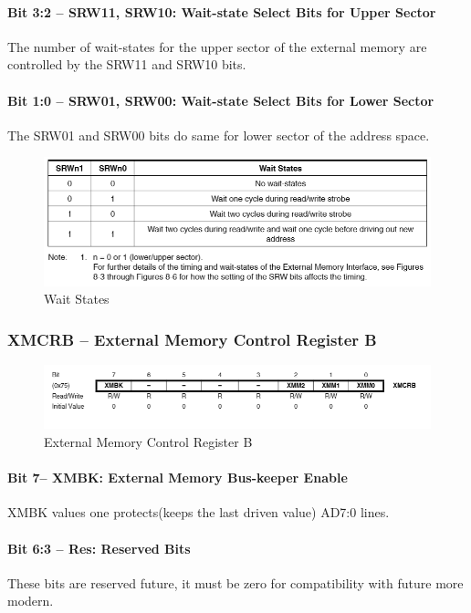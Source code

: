 \documentclass[english]{article}
\begin{document}
\paragraph{Bit 3:2 – SRW11, SRW10: Wait-state Select Bits for Upper Sector} The number of wait-states for the upper sector of the external memory are controlled by the SRW11 and SRW10 bits. 
\paragraph{ Bit 1:0 – SRW01, SRW00: Wait-state Select Bits for Lower Sector}The SRW01 and SRW00 bits do same for lower sector of the address space.
\begin{figure}[H]
\caption{Wait States}
\centerline{\includegraphics[scale=0.8]{MicroLab1/38p2}}
\end{figure}
\subsubsection{XMCRB – External Memory Control Register B}
\begin{figure}[H]
\centerline{\includegraphics[scale=0.8]{MicroLab1/38p3}}
\caption{External Memory Control Register B}
\end{figure}
\paragraph{Bit 7– XMBK: External Memory Bus-keeper Enable} XMBK values one protects(keeps the last driven value) AD7:0 lines.
\paragraph{Bit 6:3 – Res: Reserved Bits} These bits are reserved future, it must be zero for compatibility with future more modern.
\end{document}
